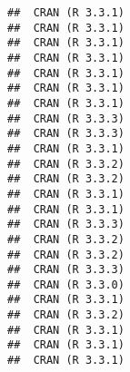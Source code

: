 \documentclass{article}\usepackage[]{graphicx}\usepackage[]{color}
\makeatletter
\newenvironment{kframe}{%
 \def\at@end@of@kframe{}%
 \ifinner\ifhmode%
  \def\at@end@of@kframe{\end{minipage}}%
  \begin{minipage}{\columnwidth}%
 \fi\fi%
 \def\FrameCommand##1{\hskip\@totalleftmargin \hskip-\fboxsep
 \colorbox{shadecolor}{##1}\hskip-\fboxsep
     \hskip-\linewidth \hskip-\@totalleftmargin \hskip\columnwidth}%
 \MakeFramed {\advance\hsize-\width
   \@totalleftmargin\z@ \linewidth\hsize
   \@setminipage}}%
 {\par\unskip\endMakeFramed%
 \at@end@of@kframe}
\newenvironment{knitrout}{}{} %
\makeatother
\begin{document}
\begin{knitrout}
\begin{kframe}
\begin{verbatim}
##  CRAN (R 3.3.1)                 
##  CRAN (R 3.3.1)                 
##  CRAN (R 3.3.1)                 
##  CRAN (R 3.3.1)                 
##  CRAN (R 3.3.1)                 
##  CRAN (R 3.3.1)                 
##  CRAN (R 3.3.1)                 
##  CRAN (R 3.3.3)                 
##  CRAN (R 3.3.3)                 
##  CRAN (R 3.3.1)                 
##  CRAN (R 3.3.2)                 
##  CRAN (R 3.3.2)                 
##  CRAN (R 3.3.1)                 
##  CRAN (R 3.3.1)                 
##  CRAN (R 3.3.3)                 
##  CRAN (R 3.3.2)                 
##  CRAN (R 3.3.2)                 
##  CRAN (R 3.3.3)                 
##  CRAN (R 3.3.0)                 
##  CRAN (R 3.3.1)                 
##  CRAN (R 3.3.2)                 
##  CRAN (R 3.3.1)                 
##  CRAN (R 3.3.1)                 
##  CRAN (R 3.3.1)
\end{verbatim}
\end{kframe}
\end{knitrout}
\end{document}
